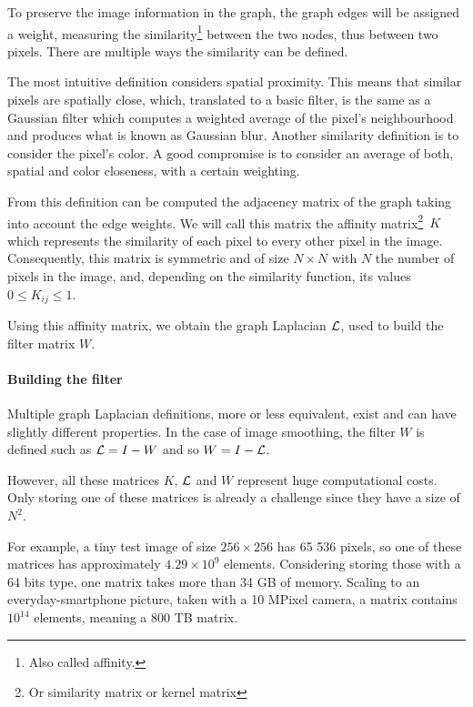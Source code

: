 To preserve the image information in the graph, the graph edges will be assigned a weight, measuring the similarity\footnote{Also called affinity.} between the two nodes, thus between two pixels.
There are multiple ways the similarity can be defined.

The most intuitive definition considers spatial proximity.
This means that similar pixels are spatially close, which, translated to a basic filter, is the same as a Gaussian filter which computes a weighted average of the pixel's neighbourhood and produces what is known as Gaussian blur.
Another similarity definition is to consider the pixel's color.
A good compromise is to consider an average of both, spatial and color closeness, with a certain weighting.

From this definition can be computed the adjacency matrix of the graph taking into account the edge weights.
We will call this matrix the affinity matrix\footnote{Or similarity matrix or kernel matrix}\ \(K\) which represents the similarity of each pixel to every other pixel in the image.
Consequently, this matrix is symmetric and of size \(N \times N\) with \(N\) the number of pixels in the image, and, depending on the similarity function, its values \(0 \le K_{ij} \le 1\).

Using this affinity matrix, we obtain the graph Laplacian \(\operatorname{\mathcal{L}}\), used to build the filter matrix \(W\).

\paragraph{Building the filter}

Multiple graph Laplacian definitions, more or less equivalent, exist and can have slightly different properties.
In the case of image smoothing, the filter \(W\) is defined such as \(\operatorname{\mathcal{L}} = I - W\) \cite{siam_slides_2016} and so \(W = I - \operatorname{\mathcal{L}}\).

However, all these matrices \(K\), \(\operatorname{\mathcal{L}}\) and \(W\) represent huge computational costs.
Only storing one of these matrices is already a challenge since they have a size of \(N^2\).

For example, a tiny test image of size \(256 \times 256\) has 65 536 pixels, so one of these matrices has approximately \(4.29 \times 10^9\) elements.
Considering storing those with a 64 bits type, one matrix takes more than 34 GB of memory.
Scaling to an everyday-smartphone picture, taken with a 10 MPixel camera, a matrix contains \(10^{14}\) elements, meaning a 800 TB matrix.

